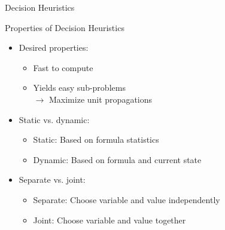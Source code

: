 \documentclass[t]{sdqbeamer}
\begin{document}
\begin{frame}{Decision Heuristics}
\begin{block}{Properties of Decision Heuristics}
	\begin{itemize}\setlength{\itemsep}{1em}
		\item Desired properties:
		\begin{itemize}\setlength{\itemsep}{1ex}
			\item Fast to compute
			\item Yields easy sub-problems\\
			$\rightarrow$ Maximize unit propagations
		\end{itemize}
		\item Static vs. dynamic:
		\begin{itemize}\setlength{\itemsep}{1ex}
			\item Static: Based on formula statistics
			\item Dynamic: Based on formula and current state
		\end{itemize}
		\item Separate vs. joint:
		\begin{itemize}\setlength{\itemsep}{1ex}
			\item Separate: Choose variable and value independently
			\item Joint: Choose variable and value together
		\end{itemize}
	\end{itemize}
\end{block}
\end{frame}
\end{document}
